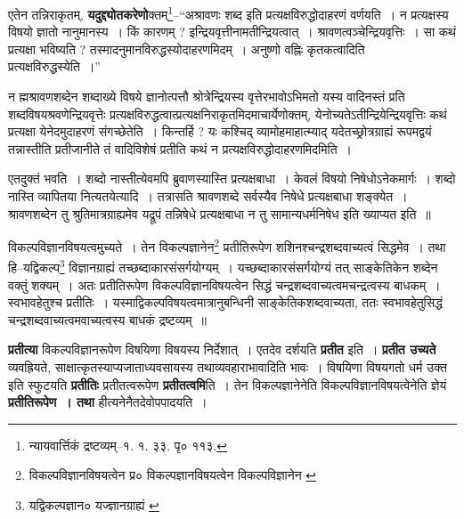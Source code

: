 \documentclass[article,12pt,a4paper]{memoir}
\begin{document}
	  \pstart एतेन तन्निराकृतम्, \textbf{यदुद्द्योतकरेणो}क्तम्\footnote{न्यायवार्त्तिकं द्रष्टव्यम्--१. १. ३३. पृ० ११३.}--“अश्रावणः शब्द इति प्रत्यक्षविरुद्धोदाहरणं वर्णयति । न प्रत्यक्षस्य विषयो ज्ञातो नानुमानस्य । किं कारणम् ? इन्द्रियवृत्तीनामतीन्द्रियत्वात् । श्रावणत्वञ्चेन्द्रियवृत्तिः । सा कथं प्रत्यक्षा भविष्यति ? तस्मादनुमानविरुद्धस्योदाहरणमिदम् । अनुष्णो वह्निः कृतकत्वादिति प्रत्यक्षविरुद्धस्येति ।”
	\pend
      

	  \pstart न ह्मश्रावणशब्देन शब्दाख्ये विषये ज्ञानोत्पत्तौ श्रोत्रेन्द्रियस्य वृत्तेरभावोऽभिमतो यस्य वादिनस्तं प्रति शब्दविषयश्रवणेन्द्रियवृत्तेः प्रत्यक्षविरुद्धत्वात्प्रत्यक्षनिराकृतमिदमाचार्येणोक्तम्, येनोच्यतेऽतीन्द्रियेन्द्रियवृत्तिः कथं प्रत्यक्षा येनेदमुदाहरणं संगच्छेतेति । किन्तर्हि ? यः कश्चिद् व्यामोहमाहात्म्याद् यदेतच्छ्रोत्रग्राह्यं रूपमद्वयं तन्नास्तीति प्रतीजानीते तं वादिविशेषं प्रतीति कथं न प्रत्यक्षविरुद्धोदाहरणमिदमिति ।
	\pend
      

	  \pstart एतदुक्तं भवति । शब्दो नास्तीत्येवमपि ब्रुवाणस्यास्ति प्रत्यक्षबाधा । केवलं विषयो निषेधोऽनेकमार्गः । शब्दो नास्ति व्यापितया नित्यतयेत्यादि । तत्रासति श्रावणशब्दे सर्वस्यैव निषेधे प्रत्यक्षबाधा शङ्क्येत । श्रावणशब्देन तु श्रुतिमात्रग्राह्यमेव यद्रूपं तन्निषेधे प्रत्यक्षबाधा न तु सामान्यधर्मनिषेध इति ख्याप्यत इति ॥
	\pend
      \leavevmode{}
	  \bigskip
	  \begingroup
	

	  \pstart विकल्पविज्ञानविषयत्वमुच्यते । तेन विकल्पज्ञानेन\footnote{विकल्पविज्ञानविषयत्वेन प्र० \cite{dp-msB} \cite{dp-edP} \cite{dp-edH} \cite{dp-edE} विकल्पज्ञानविषयत्वेन \cite{dp-msC} \cite{dp-msD} विकल्पविज्ञानेन \cite{dp-msA}} प्रतीतिरूपेण शशिनश्चन्द्रशब्दवाच्यत्वं सिद्धमेव । तथा हि--यद्विकल्प\footnote{यद्विकल्पज्ञान० \cite{dp-msB} \cite{dp-edP} \cite{dp-edH} \cite{dp-edN} यज्ज्ञानग्राह्यं \cite{dp-msA}} विज्ञानग्राह्यं तच्छब्दाकारसंसर्गयोग्यम् । यच्छब्दाकारसंसर्गयोग्यं तत् साङ्केतिकेन शब्देन वक्तुं शक्यम् । अतः प्रतीतिरूपेण विकल्पविज्ञानविषयत्वेन सिद्धं चन्द्रशब्दवाच्यत्वमचन्द्रत्वस्य बाधकम् । स्वभावहेतुश्च प्रतीतिः । यस्माद्विकल्पविषयत्वमात्रानुबन्धिनी साङ्केतिकशब्दवाच्यता, ततः स्वभावहेतुसिद्धं चन्द्रशब्दवाच्यत्वमवाच्यत्वस्य बाधकं द्रष्टव्यम् ॥
	\pend
      
	  \endgroup
	

	  \pstart \textbf{प्रतीत्या} विकल्पविज्ञानरूपेण विषयिणा विषयस्य निर्देशात् । एतदेव दर्शयति \textbf{प्रतीत} इति । \textbf{प्रतीत उच्यते} व्यवह्रियते, साक्षात्कृतस्याप्यजाताध्यवसायस्य तथाव्यवहाराभावादिति भावः । विषयिणा विषयगतो धर्म उक्त इति स्फुटयति \textbf{प्रतीतिः} प्रतीतत्वरूपेण \textbf{प्रतीतत्वमि}ति । तेन विकल्पज्ञानेनेति विकल्पविज्ञानविषयत्वेनेति ज्ञेयं \textbf{प्रतीतिरूपेण । तथा} हीत्यनेनैतदेवोपपादयति ।
	\pend
      
\end{document}
